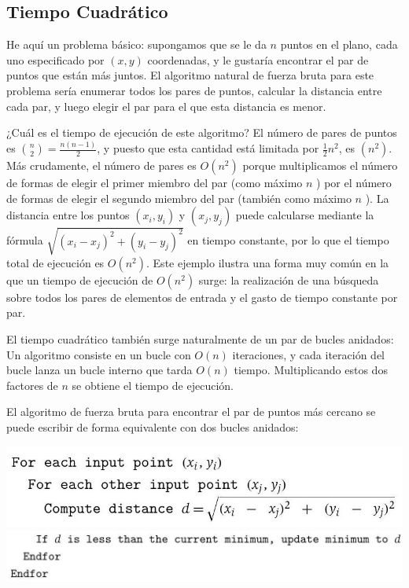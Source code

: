 \documentclass[a4paper, 12pt]{book}
\theoremstyle{dotless}
\begin{document}
\subsection*{Tiempo Cuadrático}

He aquí un problema básico: supongamos que se le da $n$ puntos en el plano, cada uno especificado por $(x,y)$ coordenadas, y le gustaría encontrar el par de puntos que están más juntos. El algoritmo natural de fuerza bruta para este problema sería enumerar todos los pares de puntos, calcular la distancia entre cada par, y luego elegir el par para el que esta distancia es menor.

¿Cuál es el tiempo de ejecución de este algoritmo? El número de pares de puntos es $\binom{n}{2}=\frac{n(n-1)}{2}$, y puesto que esta cantidad está limitada por $\frac{1}{2} n^{2}$, es $\left(n^{2}\right)$. Más crudamente, el número de pares es $O\left(n^{2}\right)$ porque multiplicamos el número de formas de elegir el primer miembro del par (como máximo $n$ ) por el número de formas de elegir el segundo miembro del par (también como máximo $n$ ). La distancia entre los puntos $\left(x_{i}, y_{i}\right)$ y $\left(x_{j}, y_{j}\right)$ puede calcularse mediante la fórmula $\sqrt{\left(x_{i}-x_{j}\right)^{2}+\left(y_{i}-y_{j}\right)^{2}}$ en tiempo constante, por lo que el tiempo total de ejecución es $O\left(n^{2}\right)$. Este ejemplo ilustra una forma muy común en la que un tiempo de ejecución de $ O\left(n^{2}\right)$ surge: la realización de una búsqueda sobre todos los pares de elementos de entrada y el gasto de tiempo constante por par.

El tiempo cuadrático también surge naturalmente de un par de bucles anidados: Un algoritmo consiste en un bucle con $O(n)$ iteraciones, y cada iteración del bucle lanza un bucle interno que tarda $O(n)$ tiempo. Multiplicando estos dos factores de $n$ se obtiene el tiempo de ejecución.

El algoritmo de fuerza bruta para encontrar el par de puntos más cercano se puede escribir de forma equivalente con dos bucles anidados:

\includegraphics[scale=0.35]{./Imagenes-Seccion2/2023_08_07_379b6f7f3185549667e3g-05}\\
\includegraphics[scale=0.35]{./Imagenes-Seccion2/2023_08_07_379b6f7f3185549667e3g-06(1)}
\end{document}
